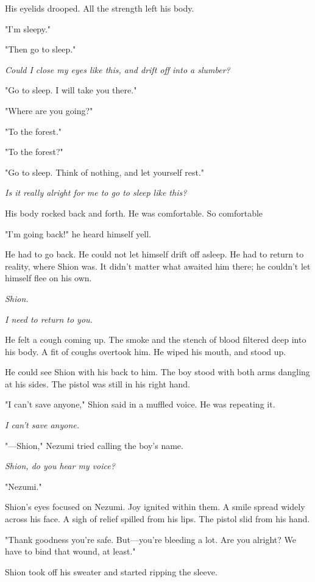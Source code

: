 His eyelids drooped. All the strength left his body.

"\el I'm sleepy."

"Then go to sleep."

\emph{Could I close my eyes like this, and drift off into a slumber?}

"Go to sleep. I will take you there."

"\el Where are you going?"

"To the forest."

"To the forest?"

"Go to sleep. Think of nothing, and let yourself rest."

\emph{Is it really alright for me to go to sleep like this?}

His body rocked back and forth. He was comfortable. So comfortable\el 

"I'm going back!" he heard himself yell.

He had to go back. He could not let himself drift off asleep. He had to
return to reality, where Shion was. It didn't matter what awaited him
there; he couldn't let himself flee on his own.

\emph{Shion.}

\emph{I need to return to you.}

\mybreak

He felt a cough coming up. The smoke and the stench of blood filtered
deep into his body. A fit of coughs overtook him. He wiped his mouth,
and stood up.

He could see Shion with his back to him. The boy stood with both arms
dangling at his sides. The pistol was still in his right hand.

"I can't save anyone," Shion said in a muffled voice. He was repeating
it.

\emph{I can't save anyone.}

"---Shion," Nezumi tried calling the boy's name.

\emph{Shion, do you hear my voice?}

"Nezumi."

Shion's eyes focused on Nezumi. Joy ignited within them. A smile spread
widely across his face. A sigh of relief spilled from his lips. The
pistol slid from his hand.

"Thank goodness you're safe. But---you're bleeding a lot. Are you alright?
We have to bind that wound, at least."

Shion took off his sweater and started ripping the sleeve.

